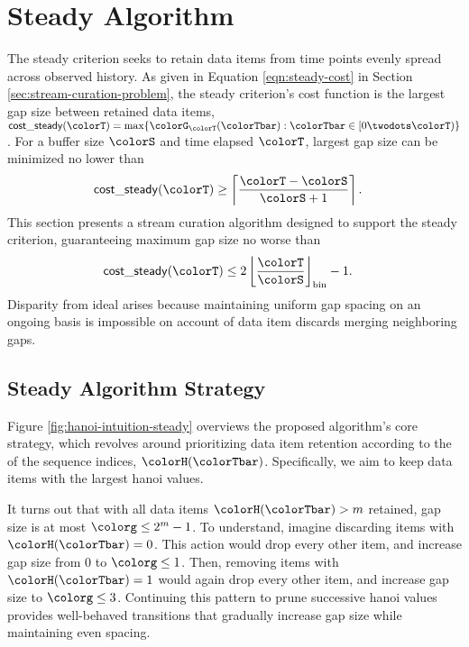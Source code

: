 \section{Steady Algorithm} \label{sec:steady}

The steady criterion seeks to retain data items from time points evenly spread across observed history.
As given in Equation \ref{eqn:steady-cost} in Section \ref{sec:stream-curation-problem}, the steady criterion's cost function is the largest gap size between retained data items, $\mathsf{cost\_steady}(\colorT) = \max\{\colorG_{\colorT}(\colorTbar) : \colorTbar \in [0 \twodots \colorT)\}$.
For a buffer size $\colorS$ and time elapsed $\colorT$, largest gap size can be minimized no lower than
\begin{align}
\mathsf{cost\_steady}(\colorT)
&\geq
\left\lceil
\frac{\colorT - \colorS}{\colorS + 1}
\right\rceil.
\label{eqn:steady-optimal-gap-size}
\end{align}
This section presents a stream curation algorithm designed to support the steady criterion, guaranteeing maximum gap size no worse than
\begin{align*}
\mathsf{cost\_steady}(\colorT)
&\leq 2 \left\lfloor \frac{\colorT}{\colorS} \right\rfloor_{\mathrm{bin}} - 1.
\end{align*}
Disparity from ideal arises because maintaining uniform gap spacing on an ongoing basis is impossible on account of data item discards merging neighboring gaps.

\subsection{Steady Algorithm Strategy}
\label{sec:steady-strategy}

Figure \ref{fig:hanoi-intuition-steady} overviews the proposed algorithm's core strategy, which revolves around prioritizing data item retention according to the \hv{} of the sequence indices, $\colorH(\colorTbar)$.
Specifically, we aim to keep data items with the largest hanoi values.

It turns out that with all data items $\colorH(\colorTbar) > m$ retained, gap size is at most $\colorg \leq 2^m - 1$.
To understand, imagine discarding items with $\colorH(\colorTbar) = 0$.
This action would drop every other item, and increase gap size from 0 to $\colorg \leq 1$.
Then, removing items with $\colorH(\colorTbar) = 1$ would again drop every other item, and increase gap size to $\colorg \leq 3$.
Continuing this pattern to prune successive hanoi values provides well-behaved transitions that gradually increase gap size while maintaining even spacing.

